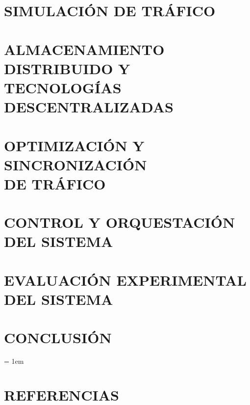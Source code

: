 \documentclass[12pt, oneside]{book}
\begin{document}
\chapter{SIMULACIÓN DE TRÁFICO}
\thispagestyle{empty}


\chapter{ALMACENAMIENTO DISTRIBUIDO Y TECNOLOGÍAS DESCENTRALIZADAS}
\thispagestyle{empty}


\chapter{OPTIMIZACIÓN Y SINCRONIZACIÓN\\DE TRÁFICO}
\thispagestyle{empty}


\chapter{CONTROL Y ORQUESTACIÓN DEL SISTEMA}
\thispagestyle{empty}


\chapter{EVALUACIÓN EXPERIMENTAL DEL SISTEMA}
\label{chp:experimentos}
\thispagestyle{empty}




\chapter{CONCLUSIÓN} \label{chp:conclusion}
\thispagestyle{empty}



\chapterformattitleonly

\emergencystretch = 1em
\chapter*{REFERENCIAS}
\printbibliography[heading=none]

\printindex

%
\end{document}
